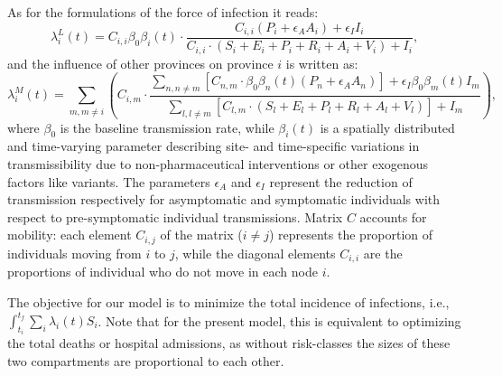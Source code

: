 As for the formulations of the force of infection it reads:
\begin{equation} 
     \lambda^L_i(t) = C_{i,i} \beta_{0}  \beta_i(t) \cdot \frac{C_{i,i}  (P_i + \epsilon_A  A_i) + \epsilon_I  I_i}{C_{i,i} \cdot (S_i + E_i + P_i + R_i + A_i + V_i) + I_i}, \label{eq:foiL}
\end{equation}
and the influence of other provinces on province $i$ is written as:
\begin{equation}
     \lambda^M_i(t) = \sum_{m, m \neq i} \left( 
     C_{i,m} \cdot 
     \frac{
     \sum_{n, n \neq m} \left[ C_{n,m} \cdot \beta_{0}  \beta_n(t)  (P_n + \epsilon_A  A_n) \right] + \epsilon_I  \beta_{0}  \beta_m(t)  I_m
     }
     {
     \sum_{l, l \neq m}  \left[C_{l, m} \cdot (S_l + E_l + P_l + R_l + A_l + V_l) \right] + I_m
     } 
     \right), \label{eq:foiM}
\end{equation}
where $\beta_{0}$ is the baseline transmission rate, while $\beta_{i}(t)$ is a spatially distributed and time-varying parameter describing site- and time-specific variations in transmissibility due to non-pharmaceutical interventions or other exogenous factors like variants. The parameters $\epsilon_A$ and $\epsilon_I$ represent the reduction of transmission respectively for asymptomatic and symptomatic individuals with respect to pre-symptomatic individual transmissions. Matrix $C$ accounts for mobility: each element $C_{i,j}$ of the matrix ($i \neq j$) represents the proportion of individuals moving from $i$ to $j$, while the diagonal elements $C_{i,i}$ are the proportions of individual who do not move in each node $i$.

The objective for our model is to minimize the total incidence of infections, i.e., $\int_{t_i}^{t_f} \sum_i \lambda_i(t) S_i$. Note that for the present model, this is equivalent to optimizing the total deaths or hospital admissions, as without risk-classes the sizes of these two compartments are proportional to each other.


